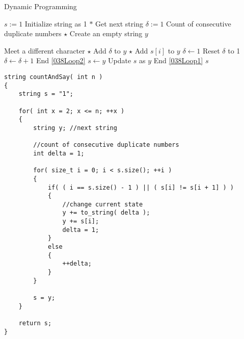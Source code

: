 \setcounter{algorithm}{0}
\begin{algorithm}[H]
\caption{Dynamic Programming}
\begin{algorithmic}[1]
\State $s:= 1$ \Comment Initialize string as 1
 \label{038Loop1}
\State $\ast$ Get next string
 \label{038Loop2}
\State $\delta:=1$ \Comment Count of consecutive duplicate numbers
\State $\star$ Create an empty string $y$
\end{algorithmic}
\end{algorithm}

\begin{algorithm}[H]
\begin{algorithmic}[1]
 \Comment Meet a different character
\State $\star$ Add $\delta$ to $y$
\State $\star$ Add $s[i]$ to $y$
\State $\delta \gets 1$ \Comment Reset $\delta$ to 1
\Else
\State $\delta\gets\delta+1$
\EndIf
\EndFor \Comment End \ref{038Loop2}
\State $s \gets y$ \Comment Update $s$ as $y$
\EndFor \Comment End \ref{038Loop1}
\State \Return $s$
\EndProcedure
\end{algorithmic}
\end{algorithm}

\setcounter{lstlisting}{0}
\begin{lstlisting}[style=customc, caption={Dynamic Programming}]
string countAndSay( int n )
{
    string s = "1";

    for( int x = 2; x <= n; ++x )
    {
        string y; //next string

        //count of consecutive duplicate numbers
        int delta = 1;

        for( size_t i = 0; i < s.size(); ++i )
        {
            if( ( i == s.size() - 1 ) || ( s[i] != s[i + 1] ) )
            {
                //change current state
                y += to_string( delta );
                y += s[i];
                delta = 1;
            }
            else
            {
                ++delta;
            }
        }

        s = y;
    }

    return s;
}
\end{lstlisting}